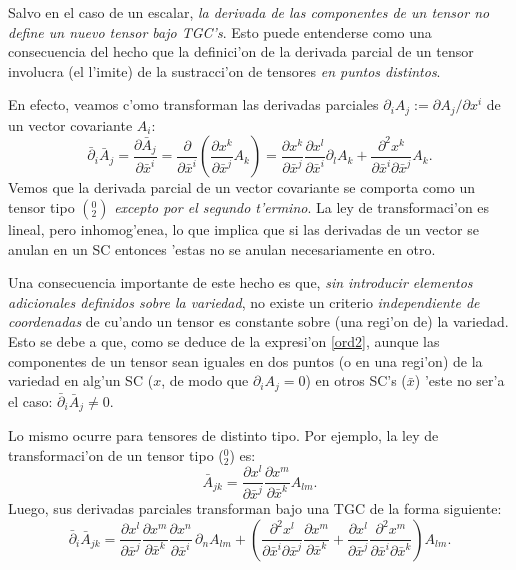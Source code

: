 Salvo en el caso de un escalar, \textit{la derivada de las componentes de un tensor no define un nuevo tensor bajo TGC's}. Esto puede entenderse como una consecuencia del hecho que la definici'on de la derivada parcial de un tensor involucra (el l'imite) de la sustracci'on de tensores \textit{en puntos distintos}.

En efecto, veamos c'omo transforman las derivadas parciales $\partial_i
A_j:={\partial A_j}/{\partial x^i}$ de un vector covariante $A_i$:
\begin{equation}
\bar{\partial}_i\bar{A}_j=\frac{\partial \bar{A}_j}{\partial
\bar{x}^i}=\frac{\partial }{\partial \bar{x}^i}\left(\frac{\partial x^k
}{\partial\bar{x}^j }A_k \right)
=\frac{\partial x^k }{\partial\bar{x}^j }\frac{\partial x^l }{\partial\bar{x}^i}
\partial_l A_k +\frac{\partial^2 x^k }{\partial\bar
{x}^i \partial\bar{x}^j }A_k . \label{ord2}
\end{equation}
Vemos que la derivada parcial de un vector covariante se comporta como un tensor tipo $(_2^0)$ \textit{excepto por el segundo t'ermino}. La ley de
transformaci'on es lineal, pero inhomog'enea, lo que implica que si las
derivadas de un vector se anulan en un SC entonces 'estas no se anulan
necesariamente en otro.

Una consecuencia importante de este hecho es que, \textit{sin introducir elementos adicionales definidos sobre la variedad}, no existe un criterio \textit{independiente de coordenadas} de cu'ando un tensor es constante sobre (una regi'on de) la variedad. Esto se debe a que, como se deduce de la expresi'on \eqref{ord2}, aunque las componentes de un tensor sean iguales en dos puntos (o en una regi'on) de la variedad en alg'un SC ($x$, de modo que $\partial_iA_j=0$) en otros SC's ($\bar{x}$) 'este no ser'a el caso: $\bar{\partial}_i\bar{A}_j\neq 0$.
 
Lo mismo ocurre para tensores de distinto tipo. Por ejemplo, la ley de transformaci'on de un tensor tipo ($_2^0$) es:
\begin{equation}
\bar{A}_{jk}=\frac{\partial x^l}{\partial\bar{x}^j} \frac{\partial x^m}{\partial\bar{x}^k}A_{lm}. \label{ord3}
\end{equation}
Luego, sus derivadas parciales transforman bajo una TGC de la forma siguiente:
\begin{equation}
\bar{\partial}_i\bar{A}_{jk}=\frac{\partial x^l}{\partial\bar{x}^j} 
\frac{\partial x^m}{\partial\bar{x}^k} \frac{\partial x^n}{\partial \bar{x}^i}\,\partial_nA_{lm}+\left(
\frac{\partial^2 x^l}{\partial\bar{x}^i\partial\bar{x}^j} \frac{\partial x^m}{\partial\bar{x}^k} 
+\frac{\partial x^l}{\partial\bar{x}^j}\frac{\partial^2 x^m}{\partial\bar{x}^i\partial\bar{x}^k}\right) A_{lm}. \label{ord4}
\end{equation}

